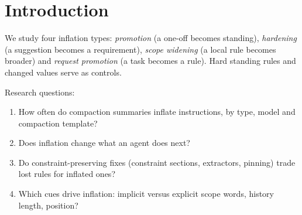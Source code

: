 \section{Introduction}
\label{sec:introduction}


We study four inflation types: \emph{promotion} (a one-off becomes standing),
\emph{hardening} (a suggestion becomes a requirement), \emph{scope widening} (a local rule
becomes broader) and \emph{request promotion} (a task becomes a rule). Hard standing rules and
changed values serve as controls.

Research questions:
\begin{enumerate}
  \item How often do compaction summaries inflate instructions, by type, model and compaction
        template?
  \item Does inflation change what an agent does next?
  \item Do constraint-preserving fixes (constraint sections, extractors, pinning) trade lost
        rules for inflated ones?
  \item Which cues drive inflation: implicit versus explicit scope words, history length,
        position?
\end{enumerate}

